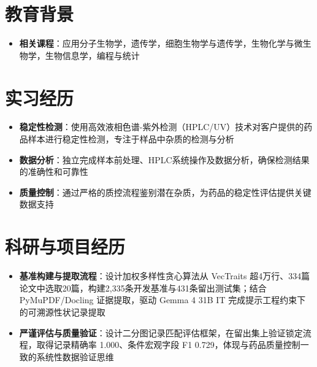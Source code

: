 \documentclass{my-resume}
\begin{document}


\section{教育背景}
\begin{itemize}[parsep=0.2ex]
  \item \textbf{相关课程}：应用分子生物学，遗传学，细胞生物学与遗传学，生物化学与微生物学，生物信息学，编程与统计
\end{itemize}

\section{实习经历}
\begin{itemize}[parsep=0.2ex]
  \item \textbf{稳定性检测}：使用高效液相色谱-紫外检测（HPLC/UV）技术对客户提供的药品样本进行稳定性检测，专注于样品中杂质的检测与分析
  \item \textbf{数据分析}：独立完成样本前处理、HPLC系统操作及数据分析，确保检测结果的准确性和可靠性
  \item \textbf{质量控制}：通过严格的质控流程鉴别潜在杂质，为药品的稳定性评估提供关键数据支持
\end{itemize}

\section{科研与项目经历}

\begin{itemize}[parsep=0.2ex]
  \item \textbf{基准构建与提取流程}：设计加权多样性贪心算法从 VecTraits 超4万行、334篇论文中选取20篇，构建2,335条开发基准与431条留出测试集；结合 PyMuPDF/Docling 证据提取，驱动 Gemma 4 31B IT 完成提示工程约束下的可溯源性状记录提取
  \item \textbf{严谨评估与质量验证}：设计二分图记录匹配评估框架，在留出集上验证锁定流程，取得记录精确率 1.000、条件宏观字段 F1 0.729，体现与药品质量控制一致的系统性数据验证思维
\end{itemize}
\end{document}
